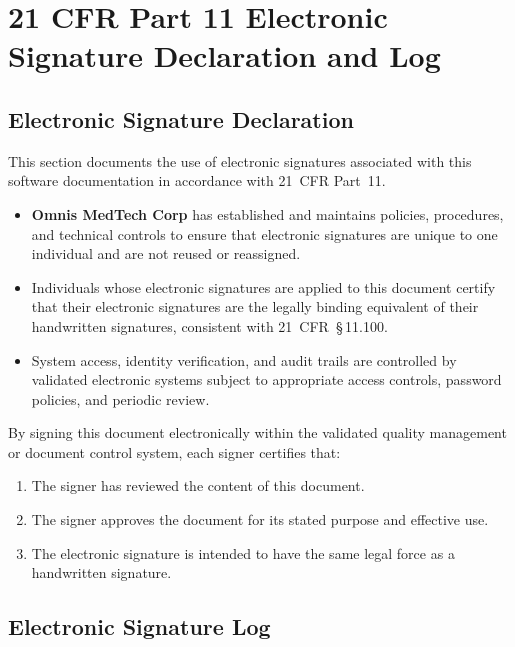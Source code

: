\documentclass[11pt]{article}
\begin{document}
\newpage

\section{21 CFR Part 11 Electronic Signature Declaration and Log}

\subsection{Electronic Signature Declaration}
This section documents the use of electronic signatures associated with this
software documentation in accordance with 21~CFR Part~11.

\begin{itemize}
    \item \textbf{Omnis MedTech Corp} has established and maintains policies,
          procedures, and technical controls to ensure that electronic signatures
          are unique to one individual and are not reused or reassigned.
    \item Individuals whose electronic signatures are applied to this document
          certify that their electronic signatures are the legally binding
          equivalent of their handwritten signatures, consistent with
          21~CFR~\S\,11.100.
    \item System access, identity verification, and audit trails are controlled
          by validated electronic systems subject to appropriate access controls,
          password policies, and periodic review.
\end{itemize}

By signing this document electronically within the validated quality management
or document control system, each signer certifies that:
\begin{enumerate}
    \item The signer has reviewed the content of this document.
    \item The signer approves the document for its stated purpose and effective use.
    \item The electronic signature is intended to have the same legal force as a
          handwritten signature.
\end{enumerate}

\subsection{Electronic Signature Log}
\end{document}
